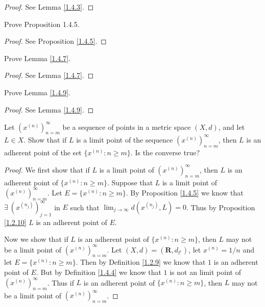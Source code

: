 \begin{proof}
    See Lemma \ref{1.4.3}.
\end{proof}

\begin{exercise}\label{ex 1.4.2}
    Prove Proposition 1.4.5.
\end{exercise}

\begin{proof}
    See Proposition \ref{1.4.5}.
\end{proof}

\begin{exercise}\label{ex 1.4.3}
    Prove Lemma \ref{1.4.7}.
\end{exercise}

\begin{proof}
    See Lemma \ref{1.4.7}.
\end{proof}

\begin{exercise}\label{ex 1.4.4}
    Prove Lemma \ref{1.4.9}.
\end{exercise}

\begin{proof}
    See Lemma \ref{1.4.9}.
\end{proof}

\begin{exercise}\label{ex 1.4.5}
    Let \((x^{(n)})_{n = m}^\infty\) be a sequence of points in a metric space \((X, d)\), and let \(L \in X\).
    Show that if \(L\) is a limit point of the sequence \((x^{(n)})_{n = m}^\infty\), then \(L\) is an adherent point of the set \(\{x^{(n)} : n \geq m\}\).
    Is the converse true?
\end{exercise}

\begin{proof}
    We first show that if \(L\) is a limit point of \((x^{(n)})_{n = m}^\infty\), then \(L\) is an adherent point of \(\{x^{(n)} : n \geq m\}\).
    Suppose that \(L\) is a limit point of \((x^{(n)})_{n = m}^\infty\).
    Let \(E = \{x^{(n)} : n \geq m\}\).
    By Proposition \ref{1.4.5} we know that \(\exists\ (x^{(n_j)})_{j = 1}^\infty\) in \(E\) such that \(\lim_{j \to \infty} d(x^{(n_j)}, L) = 0\).
    Thus by Proposition \ref{1.2.10} \(L\) is an adherent point of \(E\).

    Now we show that if \(L\) is an adherent point of \(\{x^{(n)} : n \geq m\}\), then \(L\) may not be a limit point of \((x^{(n)})_{n = m}^\infty\).
    Let \((X, d) = (\mathbf{R}, d_{l^1})\), let \(x^{(n)} = 1 / n\) and let \(E = \{x^{(n)} : n \geq m\}\).
    Then by Definition \ref{1.2.9} we know that \(1\) is an adherent point of \(E\).
    But by Definition \ref{1.4.4} we know that \(1\) is not an limit point of \((x^{(n)})_{n = m}^\infty\).
    Thus if \(L\) is an adherent point of \(\{x^{(n)} : n \geq m\}\), then \(L\) may not be a limit point of \((x^{(n)})_{n = m}^\infty\).
\end{proof}

